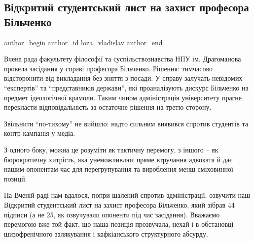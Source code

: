  
 
 
 
 
 
\subsection{Відкритий студентський лист на захист професора Більченко}
\label{sec:03_02_2021.fb.loza_vladislav.1.pismo_v_zaschity_bilchenko_vchena_rada}
\ifcmt
 author_begin
   author_id loza_vladislav
 author_end
\fi

Вчена рада факультету філософії та суспільствознавства НПУ ім. Драгоманова
провела засідання у справі професора Більченко. Рішення: тимчасово відсторонити
від викладання без зняття з посади. У справу залучать невідомих
\enquote{експертів} та \enquote{представників держави}, які проаналізують
дискурс Більченко на предмет ідеологічної крамоли. Таким чином адміністрація
університету прагне перекласти відповідальність за остаточне рішення на третю
сторону. 

Звільнити \enquote{по-тихому} не вийшло: надто сильним виявився спротив
студентів та контр-кампанія у медіа.

З одного боку, можна це розуміти як тактичну перемогу, з іншого – як
бюрократичну хитрість, яка унеможливлює пряме втручання адвоката й дає нашим
опонентам час для перегрупування та вироблення менш сміховинної позиції. 

На Вченій раді нам вдалося, попри шалений спротив адміністрації, озвучити наш
Відкритий студентський лист на захист професора Більченко, який зібрав 44
підписи (а не 25, як озвучували опоненти під час засідання). Вважаємо перемогою
вже той факт, що наша позиція прозвучала, нехай і в обстановці шизофренічного
залякування і кафкіанського структурного абсурду. 

